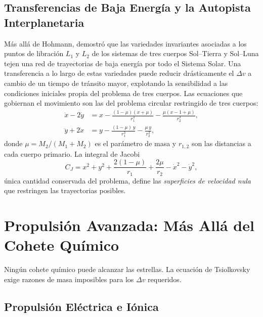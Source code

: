 \documentclass[12pt,a4paper]{article}
\begin{document}
\subsection{Transferencias de Baja Energía y la Autopista Interplanetaria}

Más allá de Hohmann, \citet{Belbruno1987} demostró que las variedades
invariantes asociadas a los puntos de libración $L_1$ y $L_2$ de los sistemas
de tres cuerpos Sol--Tierra y Sol--Luna tejen una red de trayectorias de baja
energía por todo el Sistema Solar. Una transferencia a lo largo de estas
variedades puede reducir drásticamente el $\Delta v$ a cambio de un tiempo de
tránsito mayor, explotando la sensibilidad a las condiciones iniciales propia
del problema de tres cuerpos. Las ecuaciones que gobiernan el movimiento son
las del problema circular restringido de tres cuerpos:
\begin{align}
  \ddot{x} - 2\dot{y} &= x - \frac{(1-\mu)(x+\mu)}{r_1^3}
    - \frac{\mu(x-1+\mu)}{r_2^3}, \label{eq:cr3bp_x_es}\\
  \ddot{y} + 2\dot{x} &= y - \frac{(1-\mu)\,y}{r_1^3}
    - \frac{\mu\,y}{r_2^3}, \label{eq:cr3bp_y_es}
\end{align}
donde $\mu = M_2/(M_1+M_2)$ es el parámetro de masa y $r_{1,2}$ son las
distancias a cada cuerpo primario. La integral de Jacobi
\begin{equation}
  C_J = x^2 + y^2 + \frac{2(1-\mu)}{r_1} + \frac{2\mu}{r_2}
        - \dot{x}^2 - \dot{y}^2,
  \label{eq:jacobi_es}
\end{equation}
única cantidad conservada del problema, define las \emph{superficies de
velocidad nula} que restringen las trayectorias posibles.

\section{Propulsión Avanzada: Más Allá del Cohete Químico}

Ningún cohete químico puede alcanzar las estrellas. La ecuación de Tsiolkovsky
exige razones de masa imposibles para los $\Delta v$ requeridos.

\subsection{Propulsión Eléctrica e Iónica}
\end{document}
